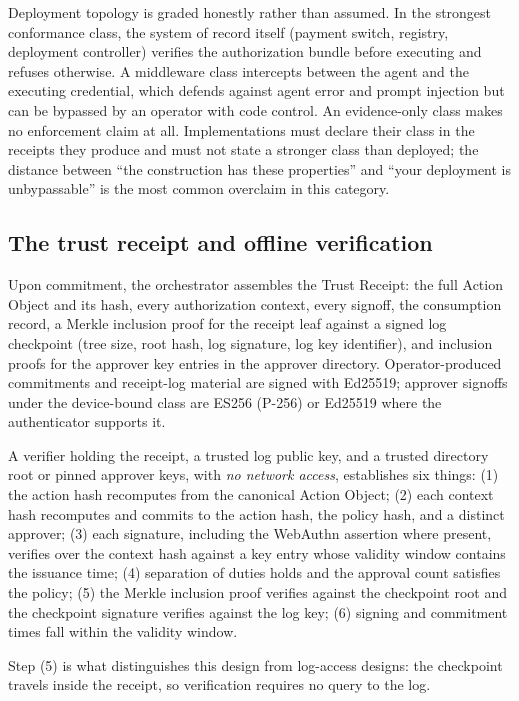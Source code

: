 \documentclass[11pt]{article}
\begin{document}
Deployment topology is graded honestly rather than assumed. In the strongest
conformance class, the system of record itself (payment switch, registry,
deployment controller) verifies the authorization bundle before executing and
refuses otherwise. A middleware class intercepts between the agent and the
executing credential, which defends against agent error and prompt injection but
can be bypassed by an operator with code control. An evidence-only class makes no
enforcement claim at all. Implementations must declare their class in the receipts
they produce and must not state a stronger class than deployed; the distance
between ``the construction has these properties'' and ``your deployment is
unbypassable'' is the most common overclaim in this category.

\subsection{The trust receipt and offline verification}

Upon commitment, the orchestrator assembles the Trust Receipt: the full Action
Object and its hash, every authorization context, every signoff, the consumption
record, a Merkle inclusion proof for the receipt leaf against a signed log
checkpoint (tree size, root hash, log signature, log key identifier), and
inclusion proofs for the approver key entries in the approver directory.
Operator-produced commitments and receipt-log material are signed with Ed25519;
approver signoffs under the device-bound class are ES256 (P-256) or Ed25519 where
the authenticator supports it.

A verifier holding the receipt, a trusted log public key, and a trusted directory
root or pinned approver keys, with \emph{no network access}, establishes six
things: (1) the action hash recomputes from the canonical Action Object; (2) each
context hash recomputes and commits to the action hash, the policy hash, and a
distinct approver; (3) each signature, including the WebAuthn assertion where
present, verifies over the context hash against a key entry whose validity window
contains the issuance time; (4) separation of duties holds and the approval count
satisfies the policy; (5) the Merkle inclusion proof verifies against the
checkpoint root and the checkpoint signature verifies against the log key; (6)
signing and commitment times fall within the validity window.

Step (5) is what distinguishes this design from log-access designs: the checkpoint
travels inside the receipt, so verification requires no query to the log.
\end{document}
